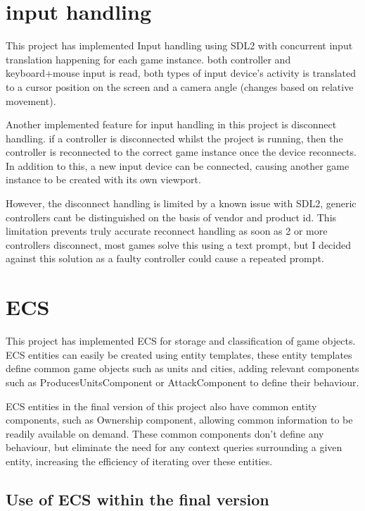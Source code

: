 \documentclass[]{final_report}
\begin{document}
\section{input handling}
This project has implemented Input handling using SDL2 with concurrent input translation happening for each game instance. both controller and keyboard+mouse input is read, both types of input device's activity is translated to a cursor position on the screen and a camera angle (changes based on relative movement).

Another implemented feature for input handling in this project is disconnect handling. if a controller is disconnected whilst the project is running, then the controller is reconnected to the correct game instance once the device reconnects. In addition to this, a new input device can be connected, causing another game instance to be created with its own viewport.

However, the disconnect handling is limited by a known issue with SDL2, generic controllers cant be distinguished on the basis of vendor and product id. This limitation prevents truly accurate reconnect handling as soon as 2 or more controllers disconnect, most games solve this using a text prompt, but I decided against this solution as a faulty controller could cause a repeated prompt.

\section{ECS}
This project has implemented ECS for storage and classification of game objects. ECS entities can easily be created using entity templates, these entity templates define common game objects such as units and cities, adding relevant components such as ProducesUnitsComponent or AttackComponent to define their behaviour.

ECS entities in the final version of this project also have common entity components, such as Ownership component, allowing common information to be readily available on demand. These common components don't define any behaviour, but eliminate the need for any context queries surrounding a given entity, increasing the efficiency of iterating over these entities.
 

\subsection{Use of ECS within the final version}
\end{document}
